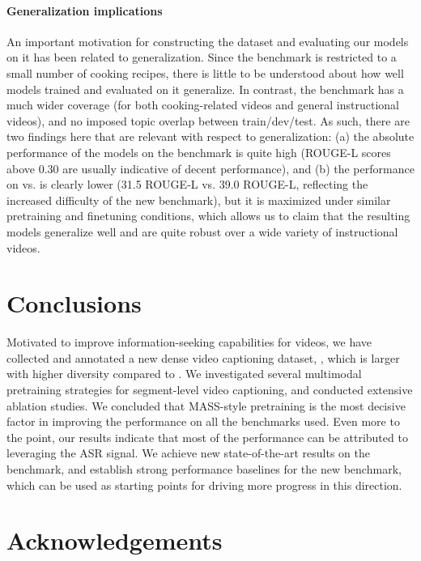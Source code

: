 \documentclass[11pt,a4paper]{article}
\begin{document}
\paragraph{Generalization implications}
An important motivation for constructing the \ldvm dataset and evaluating our models on it has been related to generalization.
Since the \youcook benchmark is restricted to a small number of cooking recipes, there is little to be understood about how well models trained and evaluated on it generalize.
In contrast, the \ldvm benchmark has a much wider coverage (for both cooking-related videos and general instructional videos), and no imposed topic overlap between train/dev/test.
As such, there are two findings here that are relevant with respect to generalization: (a) the absolute performance of the models on the \ldvm benchmark is quite high (ROUGE-L scores above 0.30 are usually indicative of decent performance), and (b) the performance on \ldvm vs. \youcook is clearly lower (31.5 ROUGE-L vs. 39.0 ROUGE-L, reflecting the increased difficulty of the new benchmark), but it is maximized under similar pretraining and finetuning conditions, which allows us to claim that the resulting models generalize well and are quite robust over a wide variety of instructional videos.

\section{Conclusions}

Motivated to improve information-seeking capabilities for videos, we have collected and annotated a new dense video captioning dataset, \ldvm, which is larger with higher diversity
compared to \youcook.
We investigated several multimodal pretraining strategies for segment-level video captioning, and conducted extensive ablation studies.
We concluded that MASS-style pretraining is the most decisive factor in improving the performance on all the benchmarks used.
Even more to the point, our results indicate that most of the performance can be attributed to leveraging the ASR signal. We achieve new state-of-the-art results on the \youcook benchmark, and establish strong performance baselines for the new \ldvm benchmark, which can be used as starting points for driving more progress in this direction.

\section*{Acknowledgements}
\end{document}
